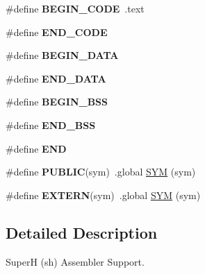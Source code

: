 \begin{DoxyCompactItemize}
\item 
\mbox{\label{group__RTEMSScoreCPUshASM_ga6d6dc213aff5b736968e2aff37eb2c99}} 
\#define {\bfseries B\+E\+G\+I\+N\+\_\+\+C\+O\+DE}~.text
\item 
\mbox{\label{group__RTEMSScoreCPUshASM_gaac423acb743520558daf6a94e1e34534}} 
\#define {\bfseries E\+N\+D\+\_\+\+C\+O\+DE}
\item 
\mbox{\label{group__RTEMSScoreCPUshASM_ga93fba2b033eb50ec004405c59faaa824}} 
\#define {\bfseries B\+E\+G\+I\+N\+\_\+\+D\+A\+TA}
\item 
\mbox{\label{group__RTEMSScoreCPUshASM_gab989978585b78e98ff314e8abb5f9bb0}} 
\#define {\bfseries E\+N\+D\+\_\+\+D\+A\+TA}
\item 
\mbox{\label{group__RTEMSScoreCPUshASM_ga50f110f0489e48ceda4a0473a35d2978}} 
\#define {\bfseries B\+E\+G\+I\+N\+\_\+\+B\+SS}
\item 
\mbox{\label{group__RTEMSScoreCPUshASM_gae8acdd1ba8aa625ce8a829773fd512e2}} 
\#define {\bfseries E\+N\+D\+\_\+\+B\+SS}
\item 
\mbox{\label{group__RTEMSScoreCPUshASM_ga29fd18bed01c4d836c7ebfe73a125c3f}} 
\#define {\bfseries E\+ND}
\item 
\mbox{\label{group__RTEMSScoreCPUshASM_ga5e536c0e80cb78da6a74541281111e40}} 
\#define {\bfseries P\+U\+B\+L\+IC}(sym)~.global \mbox{\hyperlink{group__RTEMSScoreCPUx86-64ASM_gafe05d428a5f345f51fb591debb815325}{S\+YM}} (sym)
\item 
\mbox{\label{group__RTEMSScoreCPUshASM_ga9808b867f8d1bd54d78548a5cd5dc415}} 
\#define {\bfseries E\+X\+T\+E\+RN}(sym)~.global \mbox{\hyperlink{group__RTEMSScoreCPUx86-64ASM_gafe05d428a5f345f51fb591debb815325}{S\+YM}} (sym)
\end{DoxyCompactItemize}


\subsection{Detailed Description}
SuperH (sh) Assembler Support. 

